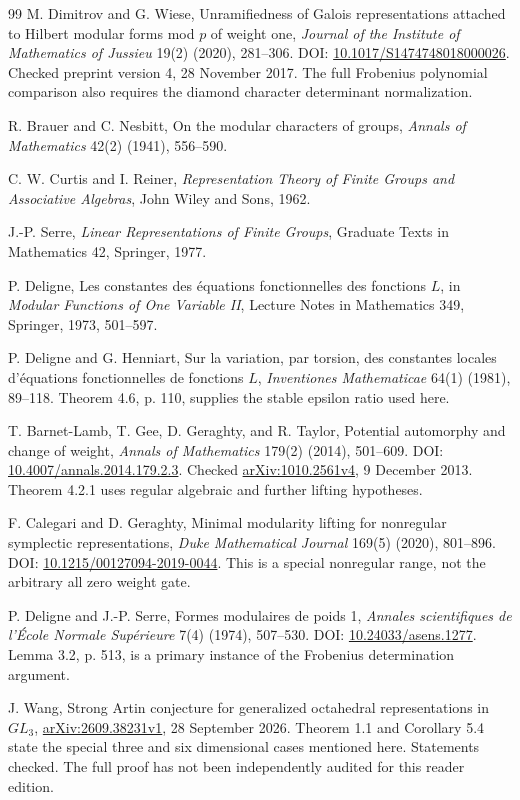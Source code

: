 \begin{thebibliography}{99}
M. Dimitrov and G. Wiese, Unramifiedness of Galois representations attached to Hilbert modular forms mod \(p\) of weight one, \emph{Journal of the Institute of Mathematics of Jussieu} 19(2) (2020), 281--306. DOI: \href{https://doi.org/10.1017/S1474748018000026}{10.1017/S1474748018000026}. Checked preprint version 4, 28 November 2017. The full Frobenius polynomial comparison also requires the diamond character determinant normalization.

R. Brauer and C. Nesbitt, On the modular characters of groups, \emph{Annals of Mathematics} 42(2) (1941), 556--590.

C. W. Curtis and I. Reiner, \emph{Representation Theory of Finite Groups and Associative Algebras}, John Wiley and Sons, 1962.

J.-P. Serre, \emph{Linear Representations of Finite Groups}, Graduate Texts in Mathematics 42, Springer, 1977.

P. Deligne, Les constantes des \'equations fonctionnelles des fonctions \(L\), in \emph{Modular Functions of One Variable II}, Lecture Notes in Mathematics 349, Springer, 1973, 501--597.

P. Deligne and G. Henniart, Sur la variation, par torsion, des constantes locales d'\'equations fonctionnelles de fonctions \(L\), \emph{Inventiones Mathematicae} 64(1) (1981), 89--118. Theorem 4.6, p. 110, supplies the stable epsilon ratio used here.

T. Barnet-Lamb, T. Gee, D. Geraghty, and R. Taylor, Potential automorphy and change of weight, \emph{Annals of Mathematics} 179(2) (2014), 501--609. DOI: \href{https://doi.org/10.4007/annals.2014.179.2.3}{10.4007/annals.2014.179.2.3}. Checked \href{https://arxiv.org/abs/1010.2561}{arXiv:1010.2561v4}, 9 December 2013. Theorem 4.2.1 uses regular algebraic and further lifting hypotheses.

F. Calegari and D. Geraghty, Minimal modularity lifting for nonregular symplectic representations, \emph{Duke Mathematical Journal} 169(5) (2020), 801--896. DOI: \href{https://doi.org/10.1215/00127094-2019-0044}{10.1215/00127094-2019-0044}. This is a special nonregular range, not the arbitrary all zero weight gate.

P. Deligne and J.-P. Serre, Formes modulaires de poids 1, \emph{Annales scientifiques de l'\'Ecole Normale Sup\'erieure} 7(4) (1974), 507--530. DOI: \href{https://doi.org/10.24033/asens.1277}{10.24033/asens.1277}. Lemma 3.2, p. 513, is a primary instance of the Frobenius determination argument.

J. Wang, Strong Artin conjecture for generalized octahedral representations in \(GL_3\), \href{https://arxiv.org/abs/2609.38231}{arXiv:2609.38231v1}, 28 September 2026. Theorem 1.1 and Corollary 5.4 state the special three and six dimensional cases mentioned here. Statements checked. The full proof has not been independently audited for this reader edition.
\end{thebibliography}
